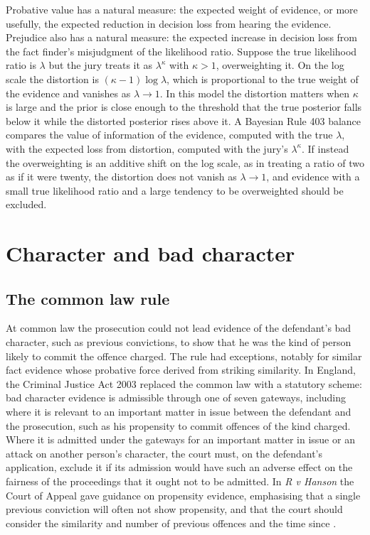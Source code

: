 Probative value has a natural measure: the expected weight of evidence, or more usefully, the expected reduction in decision loss from hearing the evidence. Prejudice also has a natural measure: the expected increase in decision loss from the fact finder's misjudgment of the likelihood ratio. Suppose the true likelihood ratio is $\lambda$ but the jury treats it as $\lambda^\kappa$ with $\kappa > 1$, overweighting it. On the log scale the distortion is $(\kappa-1)\log\lambda$, which is proportional to the true weight of the evidence and vanishes as $\lambda\to 1$. In this model the distortion matters when $\kappa$ is large and the prior is close enough to the threshold that the true posterior falls below it while the distorted posterior rises above it. A Bayesian Rule 403 balance compares the value of information of the evidence, computed with the true $\lambda$, with the expected loss from distortion, computed with the jury's $\lambda^\kappa$. If instead the overweighting is an additive shift on the log scale, as in treating a ratio of two as if it were twenty, the distortion does not vanish as $\lambda\to 1$, and evidence with a small true likelihood ratio and a large tendency to be overweighted should be excluded.

\section{Character and bad character}

\subsection{The common law rule}

At common law the prosecution could not lead evidence of the defendant's bad character, such as previous convictions, to show that he was the kind of person likely to commit the offence charged. The rule had exceptions, notably for similar fact evidence whose probative force derived from striking similarity. In England, the Criminal Justice Act 2003 replaced the common law with a statutory scheme: bad character evidence is admissible through one of seven gateways, including where it is relevant to an important matter in issue between the defendant and the prosecution, such as his propensity to commit offences of the kind charged. Where it is admitted under the gateways for an important matter in issue or an attack on another person's character, the court must, on the defendant's application, exclude it if its admission would have such an adverse effect on the fairness of the proceedings that it ought not to be admitted. In \emph{R v Hanson} the Court of Appeal gave guidance on propensity evidence, emphasising that a single previous conviction will often not show propensity, and that the court should consider the similarity and number of previous offences and the time since \citep{hanson2005}.

